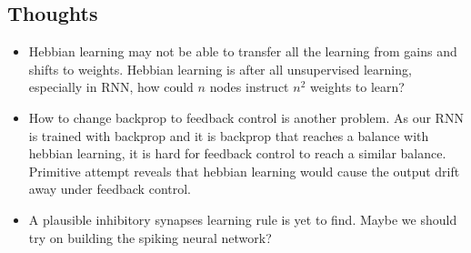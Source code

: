 \documentclass[12pt, a4paper]{article}
\begin{document}
\subsection*{Thoughts}

\begin{itemize}
    \item Hebbian learning may not be able to transfer all the learning from gains and shifts to weights. Hebbian learning is after all unsupervised learning, especially in RNN, how could $n$ nodes instruct $n^2$ weights to learn?
    \item How to change backprop to feedback control is another problem. As our RNN is trained with backprop and it is backprop that reaches a balance with hebbian learning, it is hard for feedback control to reach a similar balance. Primitive attempt reveals that hebbian learning would cause the output drift away under feedback control.
    \item A plausible inhibitory synapses learning rule is yet to find. Maybe we should try on building the spiking neural network?
\end{itemize}

\newpage
\end{document}
